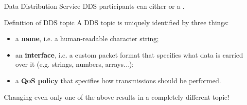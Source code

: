 \begin{frame}{Data Distribution Service}
DDS participants can either  or  a .
\begin{block}{Definition of DDS topic}
    A DDS topic is uniquely identified by three things:
    \begin{itemize}
        \item a \textbf{name}, i.e. a human-readable character string;
        \item an \textbf{interface}, i.e. a custom packet format that specifies what data is carried over it (e.g. strings, numbers, arrays...);
        \item a \textbf{QoS policy} that specifies how transmissions should be performed.
    \end{itemize}
\end{block}
\begin{block}{}
    \centering
    Changing even only one of the above results in a completely different topic!
\end{block}
\end{frame}
